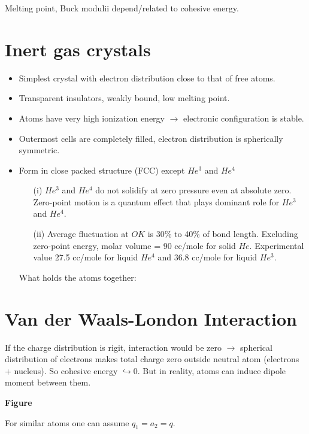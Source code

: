 Melting point, Buck modulii depend/related to cohesive energy.

\section*{Inert gas crystals}
\begin{itemize}
\item Simplest crystal with electron distribution close to that of free atoms.

\item Transparent insulators, weakly bound, low melting point.

\item Atoms have very high ionization energy $\to$ electronic configuration is stable.

\item Outermost cells are completely filled, electron distribution is spherically symmetric.

\item Form in close packed structure (FCC) except $He^{3}$ and $He^{4}$
\begin{itemize}
\item[(i)] $He^{3}$ and $He^{4}$ do not solidify at zero pressure even at absolute zero. Zero-point motion is a quantum effect that plays dominant role for $He^{3}$ and $He^{4}$.

\item[(ii)] Average fluctuation at $OK$ is 30\% to 40\% of bond length. Excluding zero-point energy, molar volume = 90 cc/mole for solid $He$. Experimental value 27.5 cc/mole for liquid $He^{4}$ and 36.8 cc/mole for liquid $He^{3}$.
\end{itemize}
What holds the atoms together:
\end{itemize}

\section*{Van der Waals-London Interaction}

If the charge distribution is rigit, interaction would be zero $\to$ spherical distribution of electrons makes total charge zero outside neutral atom (electrons + nucleus). So cohesive energy $\hookrightarrow 0$. But in reality, atoms can induce dipole moment between them.
\begin{center}
{\bf Figure}
\end{center}

For similar atoms one can assume $q_{1}=a_{2}=q$.

